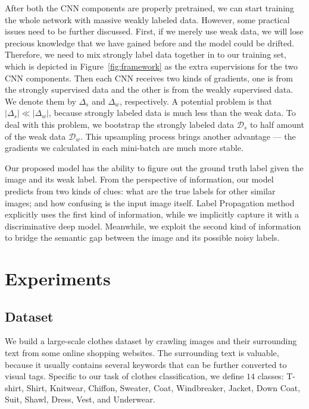 \documentclass[10pt,twocolumn,letterpaper]{article}
\begin{document}
After both the CNN components are properly pretrained, we can start training the whole network with massive weakly labeled data. However, some practical issues need to be further discussed. First, if we merely use weak data, we will lose precious knowledge that we have gained before and the model could be drifted. Therefore, we need to mix strongly label data together in to our training set, which is depicted in Figure~\ref{fig:framework} as the extra supervisions for the two CNN components. Then each CNN receives two kinds of gradients, one is from the strongly supervised data and the other is from the weakly supervised data. We denote them by $\Delta_s$ and $\Delta_w$, respectively. A potential problem is that $|\Delta_s| \ll |\Delta_w|$, because strongly labeled data is much less than the weak data. To deal with this problem, we bootstrap the strongly labeled data $\mathcal{D}_s$ to half amount of the weak data $\mathcal{D}_w$. This upsampling process brings another advantage --- the gradients we calculated in each mini-batch are much more stable.

Our proposed model has the ability to figure out the ground truth label given the image and its weak label. From the perspective of information, our model predicts from two kinds of clues: what are the true labels for other similar images; and how confusing is the input image itself. Label Propagation method~\cite{zhu2002learning} explicitly uses the first kind of information, while we implicitly capture it with a discriminative deep model. Meanwhile, we exploit the second kind of information to bridge the semantic gap between the image and its possible noisy labels.

\section{Experiments} %
\label{sec:experiments}

\subsection{Dataset} %
\label{sub:dataset}
We build a large-scale clothes dataset by crawling images and their surrounding text from some online shopping websites. The surrounding text is valuable, because it usually contains several keywords that can be further converted to visual tags. Specific to our task of clothes classification, we define $14$ classes: T-shirt, Shirt, Knitwear, Chiffon, Sweater, Coat, Windbreaker, Jacket, Down Coat, Suit, Shawl, Dress, Vest, and Underwear.
\end{document}
